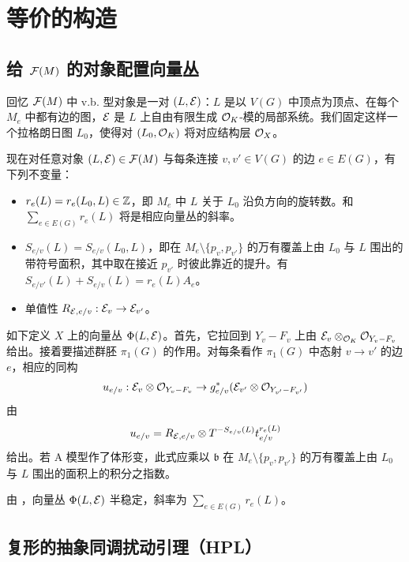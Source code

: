 \section{等价的构造}\label{s:equivalence}

\subsection{给 $\mathcal{F}(M)$ 的对象配置向量丛}\label{ss:assignbundles}

回忆 $\mathcal{F}(M)$ 中 v.b. 型对象是一对 $(L,\mathcal{E})$：$L$ 是以 $V(G)$ 中顶点为顶点、在每个 $M_e$ 中都有边的图，$\mathcal{E}$ 是 $L$ 上自由有限生成 $\mathcal{O}_K$-模的局部系统。我们固定这样一个拉格朗日图 $L_0$，使得对 $(L_0,\mathcal{O}_K)$ 将对应结构层 $\mathcal{O}_X$。

现在对任意对象 $(L,\mathcal{E})\in\mathcal{F}(M)$ 与每条连接 $v,v'\in V(G)$ 的边 $e\in E(G)$，有下列不变量：
\begin{itemize}
\item $r_e(L)=r_e(L_0,L)\in \mathbb{Z}$，即 $M_e$ 中 $L$ 关于 $L_0$ 沿负方向的旋转数。和 $\sum_{e\in E(G)}r_e(L)$ 将是相应向量丛的斜率。
\item $S_{e/v}(L)=S_{e/v}(L_0,L)$，即在 $M_e\setminus\{p_v,p_{v'}\}$ 的万有覆盖上由 $L_0$ 与 $L$ 围出的带符号面积，其中取在接近 $p_{v'}$ 时彼此靠近的提升。有 $S_{e/v'}(L)+S_{e/v}(L)=r_{e}(L)A_e$。
\item 单值性 $R_{\mathcal{E},e/v}:\mathcal{E}_v\to\mathcal{E}_{v'}$。
\end{itemize}

如下定义 $X$ 上的向量丛 $\Phi(L,\mathcal{E})$。首先，它拉回到 $Y_v-F_v$ 上由 $\mathcal{E}_v\otimes_{\mathcal{O}_K}\mathcal{O}_{Y_v-F_v}$ 给出。接着要描述群胚 $\pi_1(G)$ 的作用。对每条看作 $\pi_1(G)$ 中态射 $v\to v'$ 的边 $e$，相应的同构
\[
u_{e/v}:\mathcal{E}_v\otimes\mathcal{O}_{Y_v-F_v}\to g_{e/v}^*(\mathcal{E}_{v'}\otimes\mathcal{O}_{Y_{v'}-F_{v'}})
\]
由
\begin{equation}\label{eq:gluingdata}
u_{e/v}=R_{\mathcal{E},e/v}\otimes T^{-S_{e/v}(L)}t_{e/v}^{r_e(L)}
\end{equation}
给出。若 A 模型作了体形变，此式应乘以 $\mathfrak{b}$ 在 $M_e\setminus\{p_v,p_{v'}\}$ 的万有覆盖上由 $L_0$ 与 $L$ 围出的面积上的积分之指数。

由 \cite{Fa}，向量丛 $\Phi(L,\mathcal{E})$ 半稳定，斜率为 $\sum_{e\in E(G)}r_e(L)$。

\subsection{复形的抽象同调扰动引理（HPL）}\label{ss:HPL}

